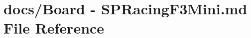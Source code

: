 \hypertarget{Board_01-_01SPRacingF3Mini_8md}{\section{docs/\+Board -\/ S\+P\+Racing\+F3\+Mini.\+md File Reference}
\label{Board_01-_01SPRacingF3Mini_8md}
}
